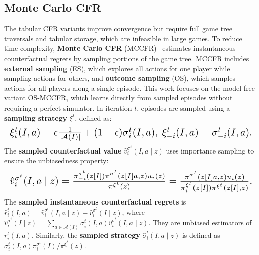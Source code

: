\documentclass[letterpaper]{article} %
\makeatletter
\renewenvironment{align*}{%
  \linenomath 
  \start@align\@ne\st@rredtrue\m@ne
}{%
  \endalign
  \endlinenomath 
}
\makeatother
\begin{document}
\subsection{Monte Carlo CFR}
The tabular CFR variants improve convergence but require full game tree traversals and tabular storage, which are infeasible in large games. 
To reduce time complexity, \textbf{Monte Carlo CFR} (MCCFR)~\cite{lanctot2009monte} estimates instantaneous counterfactual regrets by sampling portions of the game tree. 
MCCFR includes \textbf{external sampling} (ES), which explores all actions for one player while sampling actions for others, and \textbf{outcome sampling} (OS), which samples actions for all players along a single episode. This work focuses on the model-free variant OS-MCCFR, which learns directly from sampled episodes without requiring a perfect simulator.
In iteration $t$, episodes are sampled using a \textbf{sampling strategy} $\xi^t$, defined as:
\begin{align*}
\resizebox{1\linewidth}{!}{$
\xi^t_i (I, a)= \epsilon \frac{1}{\left\vert \mathcal{A}(I) \right\vert} + (1 - \epsilon)\sigma_i^t(I, a), \;\xi_{-i}^t(I, a) = \sigma_{-i}^t(I, a).
$}
\end{align*}
The \textbf{sampled counterfactual value} $\hat{v}_i^{\sigma^t}(I, a \mid z)$ uses importance sampling to ensure the unbiasedness property:
\begin{align*}
\resizebox{1\linewidth}{!}{$
\hat{v}_i^{\sigma^t}(I, a \mid z) = \frac{\pi_{-i}^{\sigma^t}(z[I])\pi^{\sigma^t}(z[I]a, z)u_i(z)}{\pi^{\xi^t}(z)} = \frac{\pi^{\sigma^t}(z[I]a, z)u_i(z)}{\pi_i^{\xi^t}(z[I])\pi^{\xi^t}(z[I], z)}.
$}
\end{align*}
The \textbf{sampled instantaneous counterfactual regrets} is  $\hat{r}_i^t(I, a)=\hat{v}_i^{\sigma^t}(I, a \mid z) - \hat{v}_i^{\sigma^t}(I \mid z)$, where $\hat{v}_i^{\sigma^t}(I \mid z) = \sum_{a \in \mathcal{A}(I)}^{}\sigma_i^t(I, a)\hat{v}_i^{\sigma^t}(I, a \mid z)$. They are unbiased estimators of $r_i^t(I, a)$. Similarly, the \textbf{sampled strategy} $\hat{\sigma}_i^{t}(I, a \mid z)$ is defined as $\sigma_i^t(I, a)\pi^{\sigma^t}_{i}(I) / \pi^{\xi^t}(z) $.
\end{document}
